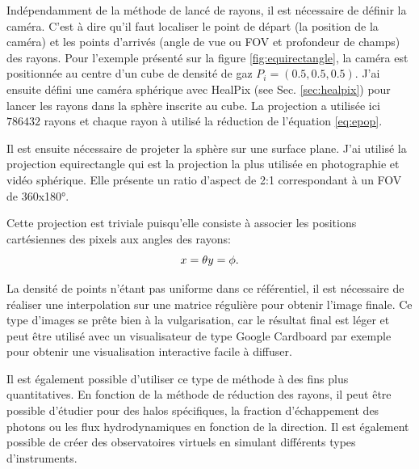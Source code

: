 Indépendamment de la méthode de lancé de rayons, il est nécessaire de définir la caméra.
C'est à dire qu'il faut localiser le point de départ (la position de la caméra) et les points d'arrivés (angle de vue ou \ac{FOV} et profondeur de champs) des rayons.
Pour l'exemple présenté sur la figure \ref{fig:equirectangle}, la caméra est positionnée au centre d'un cube de densité de gaz $P_i = (0.5,0.5,0.5)$.
J'ai ensuite défini une caméra sphérique avec HealPix (see Sec. \ref{sec:healpix}) pour lancer les rayons dans la sphère inscrite au cube.
La projection a utilisée ici $786432$ rayons et chaque rayon à utilisé la réduction de l'équation \ref{eq:epop}.

Il est ensuite nécessaire de projeter la sphère sur une surface plane.
J'ai utilisé la projection equirectangle qui est la projection la plus utilisée en photographie et vidéo sphérique.
Elle présente un ratio d'aspect de 2:1 correspondant à un \ac{FOV} de 360x180°.

Cette projection est triviale puisqu'elle consiste à associer les positions cartésiennes des pixels aux angles des rayons:
\begin{equation}
x=\theta\\
y=\phi.
\end{equation}

La densité de points n’étant pas uniforme dans ce référentiel, il est nécessaire de réaliser une interpolation sur une matrice régulière pour obtenir l'image finale.
Ce type d'images se prête bien à la vulgarisation, car le résultat final est léger et peut être utilisé avec un visualisateur de type Google Cardboard par exemple pour obtenir une visualisation interactive facile à diffuser.

Il est également possible d'utiliser ce type de méthode à des fins plus quantitatives.
En fonction de la méthode de réduction des rayons, il peut être possible d'étudier pour des halos spécifiques, la fraction d'échappement des photons ou les flux hydrodynamiques en fonction de la direction. 
Il est également possible de créer des observatoires virtuels en simulant différents types d'instruments.

